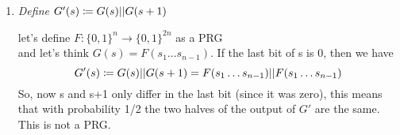\documentclass[12pt]{article}
\begin{document}
\begin{enumerate}
\item \emph{Define $G'(s) \coloneqq G(s) || G(s+1)$}

let's define $F: \{0,1\}^n \rightarrow \{0,1\}^{2n}$ as a PRG \\
and let's think $G(s)=F(s_1\dots s_{n-1})$. If the last bit of s is 0, then we have
\begin{equation*}
G'(s) \coloneqq G(s) || G(s+1) = F(s_1\dots s_{n-1})||F(s_1\dots s_{n-1})
\end{equation*}
So, now s and s+1 only differ in the last bit (since it was zero), this means that with probability 1/2 the two halves of the output of $G'$ are the same. This is not a PRG.





\end{enumerate}
\end{document}
